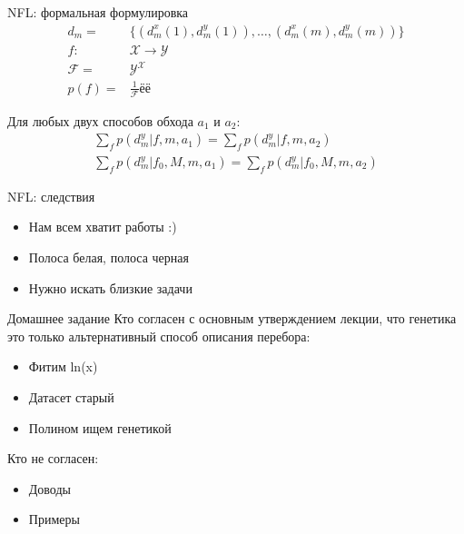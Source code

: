 \documentclass[14pt, fleqn, xcolor={dvipsnames, table}]{beamer}
\begin{document}
\begin{frame}{NFL: формальная формулировка}
$$\begin{array}{rl}
d_m =& \{(d^x_m(1), d^y_m(1)), \ldots, (d^x_m(m), d^y_m(m))\} \\
f: & \mathcal{X} \to \mathcal{Y} \\
\mathcal{F}= & \mathcal{Y}^\mathcal{X} \\
p(f) = & \frac{1}{\mathcal{F}} ёё
\end{array}$$

\begin{theorem}
Для любых двух способов обхода $a_1$ и $a_2$:
$$\begin{array}{rl}
\sum_f p(d^y_m|f,m,a_1) = \sum_f p(d^y_m|f,m,a_2) \\
\sum_f p(d^y_m|f_0,M,m,a_1) = \sum_f p(d^y_m|f_0,M,m,a_2)
\end{array}$$
\end{theorem}
\end{frame}

\begin{frame}{NFL: следствия}
\begin{itemize}
  \item Нам всем хватит работы :)
  \item Полоса белая, полоса черная
  \item Нужно искать близкие задачи
\end{itemize}
\end{frame}


\begin{frame}{Домашнее задание}
Кто согласен с основным утверждением лекции, что генетика это только альтернативный способ описания перебора:
\begin{itemize}
  \item Фитим ln(x) 
  \item Датасет старый
  \item Полином ищем генетикой
\end{itemize}
Кто не согласен:
\begin{itemize}
  \item Доводы
  \item Примеры
\end{itemize}
\end{frame}
\end{document}
